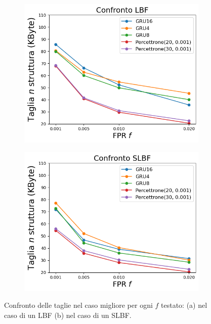 \documentclass[../../main.tex]{subfiles}
\begin{document}
        \begin{figure}[H]
            \centering
            \begin{subfigure}[b]{0.48\textwidth}
                \centering
                \includegraphics[width=\textwidth]{immagini/7/LBF/Confronto.png}
                \label{fig:LBFConfrontoFinale}
                \caption{}
            \end{subfigure}
            \begin{subfigure}[b]{0.48\textwidth}
                \centering
                \includegraphics[width=\textwidth]{immagini/7/SLBF/Confronto.png}
                \label{fig:SLBFConfrontoFinale}
                \caption{}
            \end{subfigure}
            \caption{Confronto delle taglie nel caso migliore per ogni $f$ testato: (a) nel caso di un LBF (b) nel caso di un SLBF.}
            \label{fig:ConfrontoFinale}
        \end{figure}
\end{document}
